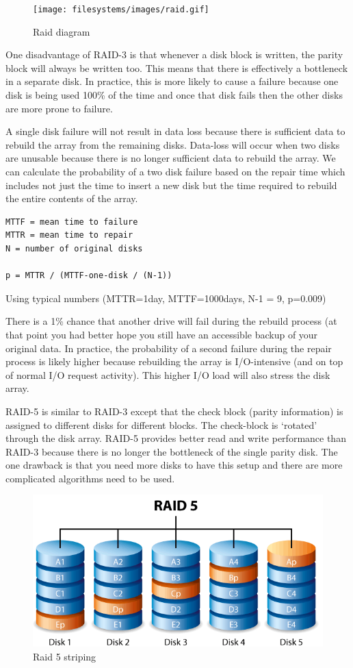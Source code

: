 \begin{figure}[htbp]
\centering
\texttt{[image: filesystems/images/raid.gif]}
\caption{Raid diagram}
\end{figure}

One disadvantage of RAID-3 is that whenever a disk block is written, the parity block will always be written too.
This means that there is effectively a bottleneck in a separate disk.
In practice, this is more likely to cause a failure because one disk is being used 100\% of the time and once that disk fails then the other disks are more prone to failure.

A single disk failure will not result in data loss because there is sufficient data to rebuild the array from the remaining disks.
Data-loss will occur when two disks are unusable because there is no longer sufficient data to rebuild the array.
We can calculate the probability of a two disk failure based on the repair time which includes not just the time to insert a new disk but the time required to rebuild the entire contents of the array.

\begin{verbatim}
MTTF = mean time to failure
MTTR = mean time to repair
N = number of original disks

p = MTTR / (MTTF-one-disk / (N-1))
\end{verbatim}

Using typical numbers (MTTR=1day, MTTF=1000days, N-1 = 9, p=0.009)

There is a 1\% chance that another drive will fail during the rebuild process (at that point you had better hope you still have an accessible backup of your original data.
In practice, the probability of a second failure during the repair process is likely higher because rebuilding the array is I/O-intensive (and on top of normal I/O request activity).
This higher I/O load will also stress the disk array.

RAID-5 is similar to RAID-3 except that the check block (parity information) is assigned to different disks for different blocks.
The check-block is `rotated' through the disk array.
RAID-5 provides better read and write performance than RAID-3 because there is no longer the bottleneck of the single parity disk.
The one drawback is that you need more disks to have this setup and there are more complicated algorithms need to be used.

\begin{figure}[htbp]
\centering
\includegraphics[width=.8\textwidth]{filesystems/images/raid_5.png}
\caption{Raid 5 striping}
\end{figure}


